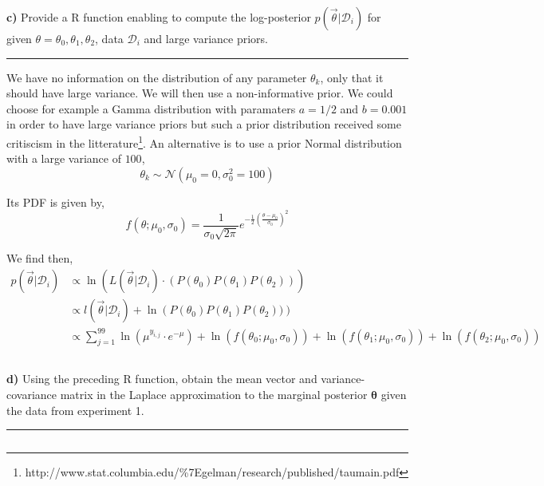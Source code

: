 \textbf{c)} Provide a R function enabling to compute the log-posterior $p(\vec{\theta}|\mathcal{D}_i)$ for given $\theta = \theta_0, \theta_1, \theta_2$, data $\mathcal{D}_i$ and large variance priors.

\begin{center}\rule{6cm}{0.4pt}\end{center}

We have no information on the distribution of any parameter $\theta_k$, only that it should have large variance. We will then use a non-informative prior. We could choose for example a Gamma distribution with paramaters $a = 1/2$ and $b = 0.001$ in order to have large variance priors but such a prior distribution received some critiscism in the litterature\footnote{http://www.stat.columbia.edu/\%7Egelman/research/published/taumain.pdf}. An alternative is to use a prior Normal distribution with a large variance of $100$,
\begin{equation}
	\theta_k \sim \mathcal{N}(\mu_0 = 0, \sigma^2_0 = 100)
\end{equation}

Its PDF is given by,
\begin{equation}
	f(\theta ; \mu_0, \sigma_0) = \frac{1}{\sigma_0\sqrt{2\pi}} e^{-\frac{1}{2}\left( \frac{\theta - \mu_0}{\sigma_0} \right)^2}
\end{equation}

We find then,
\begin{align*}
	p(\vec{\theta}|\mathcal{D}_i)
		&\propto \ln(L(\vec{\theta}|\mathcal{D}_i) \cdot (P(\theta_0) P(\theta_1) P(\theta_2))) \\
		&\propto l(\vec{\theta}|\mathcal{D}_i) + \ln\left( P(\theta_0) P(\theta_1) P(\theta_2)) \right) \\
		&\propto \sum_{j=1}^{99} \ln(\mu^{y_{i,j}} \cdot e^{-\mu}) + \ln(f(\theta_0 ; \mu_0, \sigma_0)) + \ln(f(\theta_1 ; \mu_0, \sigma_0)) + \ln(f(\theta_2 ; \mu_0, \sigma_0)) 
\end{align*}

\inputminted[frame=lines, breaklines]{r}{code/q2c.r}

\textbf{d)} Using the preceding R function, obtain the mean vector and variance-covariance matrix in the Laplace approximation to the marginal posterior $\bm{\theta}$ given the data from experiment 1.

\begin{center}\rule{6cm}{0.4pt}\end{center}

\inputminted{r}{code/q2d.r}

